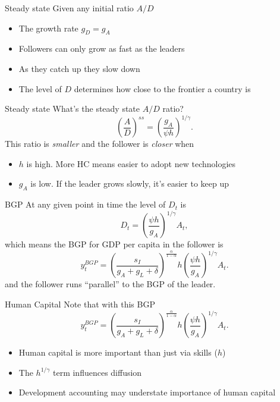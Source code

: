 \begin{frame}{Steady state}
Given any initial ratio $A/D$
\begin{itemize}
	\item The growth rate $g_D = g_A$
	\item Followers can only grow as fast as the leaders
	\item As they catch up they slow down
	\item The level of $D$ determines how close to the frontier a country is
\end{itemize}
\end{frame}

\begin{frame}{Steady state}
What's the steady state $A/D$ ratio?
\begin{equation}
	\left(\frac{A}{D}\right)^{ss} = \left(\frac{g_A}{\psi h}\right)^{1/\gamma}. \label{EQ_DAss}
\end{equation}
This ratio is \textit{smaller} and the follower is \textit{closer} when
\begin{itemize}
	\item $h$ is high. More HC means easier to adopt new technologies
	\item $g_A$ is low. If the leader grows slowly, it's easier to keep up
\end{itemize}
\end{frame}

\begin{frame}{BGP}
At any given point in time the level of $D_t$ is
\begin{equation}
	D_t = \left(\frac{\psi h}{g_A}\right)^{1/\gamma} A_t, 
\end{equation}
which means the BGP for GDP per capita in the follower is
\begin{equation}
	y_t^{BGP} = \left(\frac{s_I}{g_A + g_L + \delta} \right)^{\frac{\alpha}{1-\alpha}} h \left(\frac{\psi h}{g_A}\right)^{1/\gamma} A_t. 
\end{equation}
and the follower runs ``parallel'' to the BGP of the leader.
\end{frame}

\begin{frame}{Human Capital}
Note that with this BGP
\begin{equation}
	y_t^{BGP} = \left(\frac{s_I}{g_A + g_L + \delta} \right)^{\frac{\alpha}{1-\alpha}} h \left(\frac{\psi h}{g_A}\right)^{1/\gamma} A_t. \label{EQ_dev_yBGP}
\end{equation}
\begin{itemize}
	\item Human capital is more important than just via skills ($h$)
	\item The $h^{1/\gamma}$ term influences diffusion
	\item Development accounting may understate importance of human capital
\end{itemize}
\end{frame}

